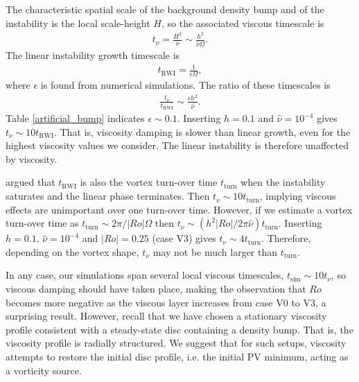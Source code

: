 The characteristic spatial scale of the background density bump and of
the instability is the local scale-height $H$, so the associated
viscous timescale is    
\begin{align}
  t_\nu = \frac{H^2}{\nu}\sim \frac{h^2}{\hat{\nu}\Omega}. 
\end{align}
The linear instability growth timescale is
\begin{align}
  t_\mathrm{RWI} = \frac{1}{\epsilon \Omega},
\end{align}
where $\epsilon$ is found from numerical simulations.   
The ratio of these timescales is
\begin{align}
  \frac{t_\nu}{t_\mathrm{RWI}} \sim \frac{\epsilon h^2}{\hat{\nu}}.
\end{align}
Table \ref{artificial_bump} indicates $\epsilon \sim 0.1$. 
Inserting $h=0.1$ and $\hat{\nu}=10^{-4}$ gives $t_\nu \sim 10
t_\mathrm{RWI}$. That is, viscosity damping is slower than linear
growth, even for the highest viscosity values we consider. 
The linear instability is therefore unaffected by viscosity. 

\cite{meheut13} argued that $t_\mathrm{RWI}$ is also the vortex
turn-over time $t_\mathrm{turn}$ when the instability saturates and
the linear phase terminates. Then 
$t_\nu\sim 10 t_\mathrm{turn}$, implying viscous effects 
are unimportant over one turn-over time. 
However, if we estimate a vortex turn-over time as $t_\mathrm{turn}
\sim 2\pi/|Ro|\Omega$ then $t_\nu\sim (h^2|Ro|/2\pi\hat{\nu})t_\mathrm{turn}$.  
Inserting $h=0.1,\,\hat{\nu}=10^{-4}$ and $|Ro|=0.25$ (case V3) gives 
$t_\nu \sim 4t_\mathrm{turn}$. Therefore, depending on the vortex shape, 
$t_\nu$ may not be much larger than $t_\mathrm{turn}$. 

In any case, our simulations span several local viscous timescales, 
$t_\mathrm{sim}\sim 10t_\nu $, so viscous damping should have taken
place, making the observation that $Ro$ becomes more negative as the 
viscous layer increases from case V0 to V3, a surprising
result. However, recall that we have chosen a stationary
viscosity profile consistent with a steady-state disc containing a
density bump. That is, the viscosity profile is radially
structured. We suggest that for such setups, viscosity attempts to
restore the initial disc profile, i.e. the initial PV minimum, acting
as a vorticity source.      

